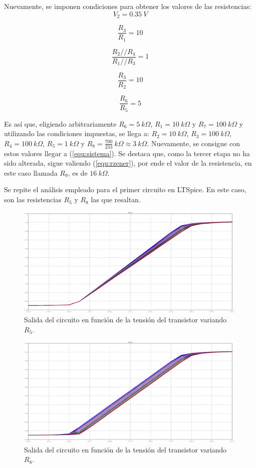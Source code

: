 \documentclass[a4paper]{article}
\begin{document}
Nuevamente, se imponen condiciones para obtener los valores de las resistencias:
\[
	V_2 = 0.35 \ V
\]

\[
	\frac{R_3}{R_1} = 10
\]

\[
	\frac{R_2 // R_4}{R_1 // R_3} = 1
\]

\[
	\frac{R_3}{R_2} = 10
\]

\[
	\frac{R_6}{R_5} = 5
\]

Es así que, eligiendo arbitrariamente $R_6 = 5 \ k\Omega$, $R_1 = 10 \ k\Omega$ y $R_7 = 100 \ k\Omega$ y utilizando las condiciones impuestas, se llega a: $R_2 = 10 \ k\Omega$, $R_3 = 100 \ k\Omega$, $R_4 = 100 \ k\Omega$, $R_5 = 1 \ k\Omega$ y $R_8 = \frac{700}{233} \ k\Omega \approx 3 \ k\Omega$. Nuevamente, se consigue con estos valores llegar a (\ref{equ:sistema}). Se destaca que, como la tercer etapa no ha sido alterada, sigue valiendo (\ref{equ:rzener}), por ende el valor de la resistencia, en este caso llamada $R_9$, es de $16 \ k\Omega$.

Se repite el análisis empleado para el primer circuito en LTSpice. En este caso, son las resistencias $R_5$ y $R_8$ las que resaltan.

\begin{figure}[H]
	\centering
	\includegraphics[width=0.99\textwidth]{Ejercicio6/Imagenes/StepR5-M2.png}
	\caption{Salida del circuito en función de la tensión del transistor variando $R_5$.}
	\label{fig:r5-M2}
\end{figure}

\begin{figure}[H]
	\centering
	\includegraphics[width=0.99\textwidth]{Ejercicio6/Imagenes/StepR8-M2.png}
	\caption{Salida del circuito en función de la tensión del transistor variando $R_8$.}
	\label{fig:r8-M2}
\end{figure}
\end{document}
